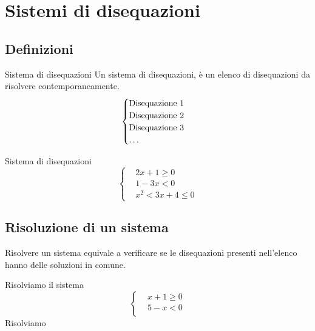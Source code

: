 \chapter{Sistemi di disequazioni}
\section{Definizioni}
\begin{definizionet}{Sistema di disequazioni}{}
	Un sistema di disequazioni, è un elenco di disequazioni da risolvere contemporaneamente.\[\begin{cases}
	\text{Disequazione 1}\\
		\text{Disequazione 2}\\
			\text{Disequazione 3}\\
				\text{\dots}\\
	\end{cases} \]
\end{definizionet}
\begin{esempiot}{Sistema di disequazioni}{}
\[\begin{cases}
&2x+1\geq 0\\
&1-3x<0\\
&x^2<3x+4\leq 0
\end{cases}\]
\end{esempiot}
\section{Risoluzione di un sistema}
Risolvere un sistema equivale a verificare se le disequazioni presenti nell'elenco hanno delle soluzioni in comune. 
\begin{esempiot}{}{}
	Risolviamo il sistema 
	\[\begin{cases}
	&x+1\geq 0\\
	&5-x<0\\
	\end{cases}\]
	Risolviamo 
\end{esempiot}